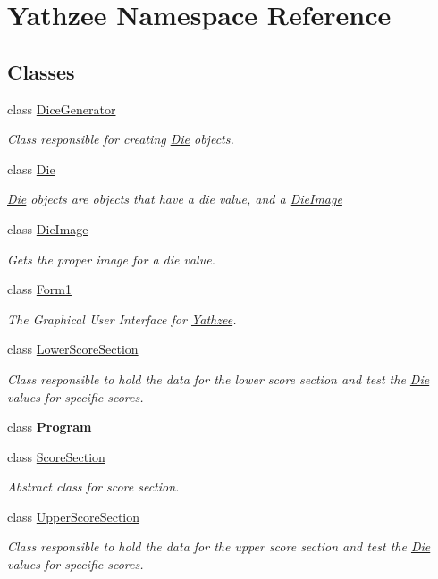 \hypertarget{namespace_yathzee}{}\section{Yathzee Namespace Reference}
\label{namespace_yathzee}
\subsection*{Classes}
\begin{DoxyCompactItemize}
\item 
class \hyperlink{class_yathzee_1_1_dice_generator}{Dice\+Generator}
\begin{DoxyCompactList}\small\item\em Class responsible for creating \hyperlink{class_yathzee_1_1_die}{Die} objects. \end{DoxyCompactList}\item 
class \hyperlink{class_yathzee_1_1_die}{Die}
\begin{DoxyCompactList}\small\item\em \hyperlink{class_yathzee_1_1_die}{Die} objects are objects that have a die value, and a \hyperlink{class_yathzee_1_1_die_image}{Die\+Image} \end{DoxyCompactList}\item 
class \hyperlink{class_yathzee_1_1_die_image}{Die\+Image}
\begin{DoxyCompactList}\small\item\em Gets the proper image for a die value. \end{DoxyCompactList}\item 
class \hyperlink{class_yathzee_1_1_form1}{Form1}
\begin{DoxyCompactList}\small\item\em The Graphical User Interface for \hyperlink{namespace_yathzee}{Yathzee}. \end{DoxyCompactList}\item 
class \hyperlink{class_yathzee_1_1_lower_score_section}{Lower\+Score\+Section}
\begin{DoxyCompactList}\small\item\em Class responsible to hold the data for the lower score section and test the \hyperlink{class_yathzee_1_1_die}{Die} values for specific scores. \end{DoxyCompactList}\item 
class {\bfseries Program}
\item 
class \hyperlink{class_yathzee_1_1_score_section}{Score\+Section}
\begin{DoxyCompactList}\small\item\em Abstract class for score section. \end{DoxyCompactList}\item 
class \hyperlink{class_yathzee_1_1_upper_score_section}{Upper\+Score\+Section}
\begin{DoxyCompactList}\small\item\em Class responsible to hold the data for the upper score section and test the \hyperlink{class_yathzee_1_1_die}{Die} values for specific scores. \end{DoxyCompactList}\end{DoxyCompactItemize}
